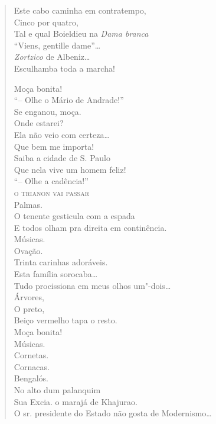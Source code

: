 \begin{verse}
Este cabo caminha em contratempo,\\
\qquad\qquad\qquad\quad Cinco por quatro,\\
\qquad\qquad Tal e qual Boieldieu na \emph{Dama branca}\\
\qquad ``Viens, gentille dame''\ldots{}\\
\quad\emph{Zortzico} de Albeniz\ldots{}\\
Esculhamba toda a marcha!

Moça bonita!\\
``-- Olhe o Mário de Andrade!''\\
Se enganou, moça.\\
\qquad\qquad\qquad Onde estarei?\\
\qquad\qquad\qquad Ela não veio com certeza\ldots{}\\
\qquad\qquad\qquad Que bem me importa!\\
\qquad\qquad\qquad Saiba a cidade de S. Paulo\\
\qquad\qquad\qquad Que nela vive um homem feliz!\\
``-- Olhe a cadência!''\\
\qquad\qquad\textsc{o trianon vai passar}\\
Palmas.\\
O tenente gesticula com a espada\\
E todos olham pra direita em continência.\\
Músicas.\\
Ovação.\\
Trinta carinhas adoráveis.\\
Esta família sorocaba\ldots{}\\
Tudo procissiona em meus olhos um"-dois\ldots{}\\
\qquad\qquad\qquad\qquad\qquad\quad Árvores,\\
\qquad\qquad\qquad\qquad\qquad\quad O preto,\\
\qquad\qquad\qquad\qquad\qquad\quad Beiço vermelho tapa o resto.\\
\qquad\qquad\qquad\qquad\qquad\quad Moça bonita!\\
\qquad\qquad\qquad\qquad\qquad\quad Músicas.\\
\qquad\qquad\qquad\qquad\qquad\quad Cornetas.\\
\qquad\qquad\qquad\qquad\quad Cornacas.\\
\qquad\qquad\qquad\quad Bengalós.\\
\qquad No alto dum palanquim\\
\qquad Sua Excia. o marajá de Khajurao.\\
O sr. presidente do Estado não gosta de Modernismo\ldots{}


\end{verse}
